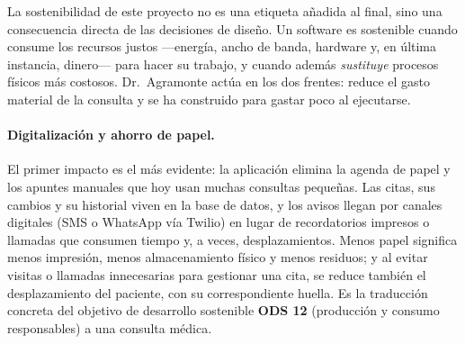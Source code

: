 \documentclass[12pt,a4paper]{report}
\begin{document}
La sostenibilidad de este proyecto no es una etiqueta añadida al final, sino una consecuencia directa de las decisiones de diseño. Un software es sostenible cuando consume los recursos justos —energía, ancho de banda, hardware y, en última instancia, dinero— para hacer su trabajo, y cuando además \emph{sustituye} procesos físicos más costosos. Dr.\ Agramonte actúa en los dos frentes: reduce el gasto material de la consulta y se ha construido para gastar poco al ejecutarse.

\paragraph{Digitalización y ahorro de papel.} El primer impacto es el más evidente: la aplicación elimina la agenda de papel y los apuntes manuales que hoy usan muchas consultas pequeñas. Las citas, sus cambios y su historial viven en la base de datos, y los avisos llegan por canales digitales (SMS o WhatsApp vía Twilio) en lugar de recordatorios impresos o llamadas que consumen tiempo y, a veces, desplazamientos. Menos papel significa menos impresión, menos almacenamiento físico y menos residuos; y al evitar visitas o llamadas innecesarias para gestionar una cita, se reduce también el desplazamiento del paciente, con su correspondiente huella. Es la traducción concreta del objetivo de desarrollo sostenible \textbf{ODS 12} (producción y consumo responsables) a una consulta médica.
\end{document}
